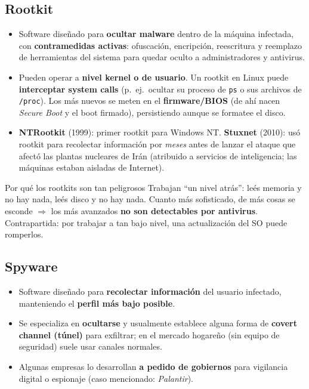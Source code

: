 \documentclass[11pt,a4paper]{article}
\begin{document}
\subsection{Rootkit}
\begin{itemize}[leftmargin=1.4em,itemsep=1pt]
  \item Software diseñado para \textbf{ocultar malware} dentro de la máquina infectada, con
        \textbf{contramedidas activas}: ofuscación, encripción, reescritura y reemplazo de
        herramientas del sistema para quedar oculto a administradores y antivirus.
  \item Pueden operar a \textbf{nivel kernel o de usuario}. Un rootkit en Linux puede
        \textbf{interceptar system calls} (p.\ ej.\ ocultar su proceso de \texttt{ps} o sus
        archivos de \texttt{/proc}). Los más nuevos se meten en el \textbf{firmware/BIOS} (de ahí
        nacen \emph{Secure Boot} y el boot firmado), persistiendo aunque se formatee el disco.
  \item \textbf{NTRootkit} (1999): primer rootkit para Windows NT.
        \textbf{Stuxnet} (2010): usó rootkit para recolectar información por \emph{meses} antes de
        lanzar el ataque que afectó las plantas nucleares de Irán (atribuido a servicios de
        inteligencia; las máquinas estaban aisladas de Internet).
\end{itemize}

\begin{warnbox}{Por qué los rootkits son tan peligrosos}
Trabajan ``un nivel atrás'': leés memoria y no hay nada, leés disco y no hay nada. Cuanto más
sofisticado, de más cosas se esconde $\Rightarrow$ los más avanzados \textbf{no son detectables
por antivirus}. Contrapartida: por trabajar a tan bajo nivel, una actualización del SO puede
romperlos.
\end{warnbox}

\subsection{Spyware}
\begin{itemize}[leftmargin=1.4em,itemsep=1pt]
  \item Software diseñado para \textbf{recolectar información} del usuario infectado, manteniendo
        el \textbf{perfil más bajo posible}.
  \item Se especializa en \textbf{ocultarse} y usualmente establece alguna forma de
        \textbf{covert channel (túnel)} para exfiltrar; en el mercado hogareño (sin equipo de
        seguridad) suele usar canales normales.
  \item Algunas empresas lo desarrollan \textbf{a pedido de gobiernos} para vigilancia digital o
        espionaje (caso mencionado: \emph{Palantir}).
\end{itemize}
\end{document}
